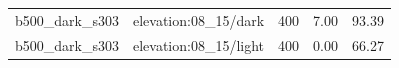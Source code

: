 \begin{longtable}{l>{\raggedright\arraybackslash}p{.42\linewidth}rrr}
b500\_\allowbreak{}dark\_\allowbreak{}s303 & %
elevation:08\_\allowbreak{}15/dark & %
400 & %
7.00 & %
93.39 \\ %

b500\_\allowbreak{}dark\_\allowbreak{}s303 & %
elevation:08\_\allowbreak{}15/light & %
400 & %
0.00 & %
66.27 \\ %


\end{longtable}

